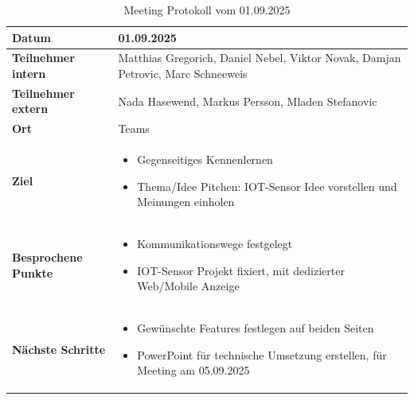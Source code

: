 \documentclass{article}
\begin{document}
\begin{table}[htbp]
  \centering
  \begin{tabularx}{\textwidth}{|>{\columncolor{black!10}}l|X|}
    \hline
    \textbf{Datum} & 01.09.2025 \\
    \hline
    \textbf{Teilnehmer intern} & Matthias Gregorich, Daniel Nebel, Viktor Novak, Damjan Petrovic, Marc Schneeweis \\ 
    \hline
    \textbf{Teilnehmer extern} & Nada Hasewend, Markus Persson, Mladen Stefanovic  \\
    \hline
    \textbf{Ort} & Teams \\ 
    \hline
    \textbf{Ziel} &
    \vspace{-0.5em}
    \begin{itemize}
        \item Gegenseitiges Kennenlernen
        \item Thema/Idee Pitchen: IOT-Sensor Idee vorstellen und Meinungen einholen
    \end{itemize} \\
    \hline
    \textbf{Besprochene Punkte} &
    \vspace{-0.5em}
    \begin{itemize}
        \item Kommunikationswege festgelegt
        \item IOT-Sensor Projekt fixiert, mit dedizierter Web/Mobile Anzeige
    \end{itemize} \\
    \hline
    \textbf{Nächste Schritte} &
    \vspace{-0.5em}
    \begin{itemize}
        \item Gewünschte Features festlegen auf beiden Seiten
        \item PowerPoint für technische Umsetzung erstellen, für Meeting am 05.09.2025
    \end{itemize} \\
    \hline
  \end{tabularx}
  \caption{Meeting Protokoll vom 01.09.2025}
  \label{tab:meeting-01-09-2025}
\end{table}
\end{document}
